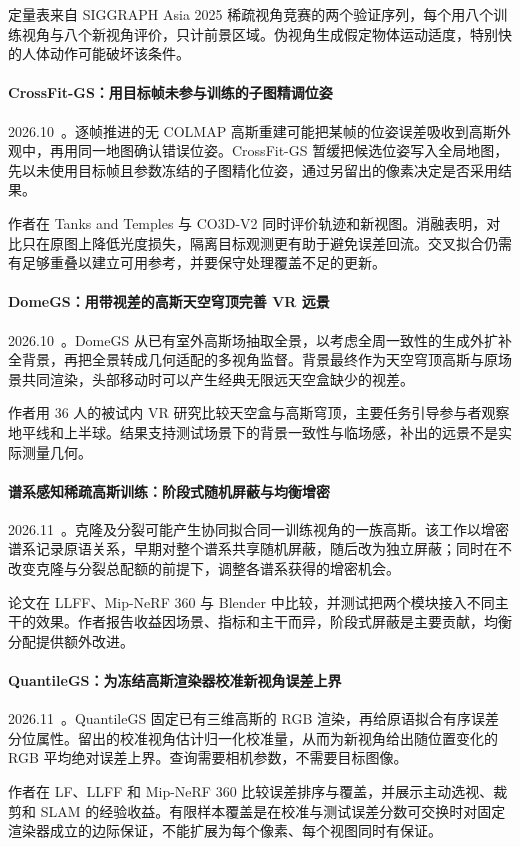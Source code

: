定量表来自 SIGGRAPH Asia 2025 稀疏视角竞赛的两个验证序列，每个用八个训练视角与八个新视角评价，只计前景区域。伪视角生成假定物体运动适度，特别快的人体动作可能破坏该条件。

\paragraph{CrossFit-GS：用目标帧未参与训练的子图精调位姿}
2026.10~\cite{2610_28190}。逐帧推进的无 COLMAP 高斯重建可能把某帧的位姿误差吸收到高斯外观中，再用同一地图确认错误位姿。CrossFit-GS 暂缓把候选位姿写入全局地图，先以未使用目标帧且参数冻结的子图精化位姿，通过另留出的像素决定是否采用结果。

作者在 Tanks and Temples 与 CO3D-V2 同时评价轨迹和新视图。消融表明，对比只在原图上降低光度损失，隔离目标观测更有助于避免误差回流。交叉拟合仍需有足够重叠以建立可用参考，并要保守处理覆盖不足的更新。

\paragraph{DomeGS：用带视差的高斯天空穹顶完善 VR 远景}
2026.10~\cite{2610_37172}。DomeGS 从已有室外高斯场抽取全景，以考虑全周一致性的生成外扩补全背景，再把全景转成几何适配的多视角监督。背景最终作为天空穹顶高斯与原场景共同渲染，头部移动时可以产生经典无限远天空盒缺少的视差。

作者用 36 人的被试内 VR 研究比较天空盒与高斯穹顶，主要任务引导参与者观察地平线和上半球。结果支持测试场景下的背景一致性与临场感，补出的远景不是实际测量几何。

\paragraph{谱系感知稀疏高斯训练：阶段式随机屏蔽与均衡增密}
2026.11~\cite{2611_17752}。克隆及分裂可能产生协同拟合同一训练视角的一族高斯。该工作以增密谱系记录原语关系，早期对整个谱系共享随机屏蔽，随后改为独立屏蔽；同时在不改变克隆与分裂总配额的前提下，调整各谱系获得的增密机会。

论文在 LLFF、Mip-NeRF 360 与 Blender 中比较，并测试把两个模块接入不同主干的效果。作者报告收益因场景、指标和主干而异，阶段式屏蔽是主要贡献，均衡分配提供额外改进。

\paragraph{QuantileGS：为冻结高斯渲染器校准新视角误差上界}
2026.11~\cite{2611_21253}。QuantileGS 固定已有三维高斯的 RGB 渲染，再给原语拟合有序误差分位属性。留出的校准视角估计归一化校准量，从而为新视角给出随位置变化的 RGB 平均绝对误差上界。查询需要相机参数，不需要目标图像。

作者在 LF、LLFF 和 Mip-NeRF 360 比较误差排序与覆盖，并展示主动选视、裁剪和 SLAM 的经验收益。有限样本覆盖是在校准与测试误差分数可交换时对固定渲染器成立的边际保证，不能扩展为每个像素、每个视图同时有保证。
